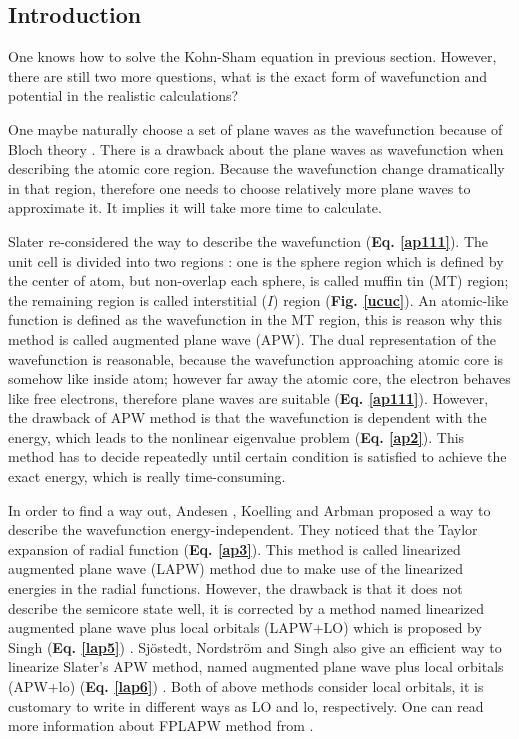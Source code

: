 \documentclass[a4paper, 12pt, titlepage,oneside,drop]{kthesis}
\begin{document}
\subsection{Introduction}

One knows how to solve the Kohn-Sham equation in previous section. However, there are still two more questions, what is the exact form of 
wavefunction and potential in the realistic calculations?  

One maybe naturally choose a set of plane waves as the wavefunction because of Bloch theory \cite{kittel1976introduction}. There is a drawback about the plane waves as wavefunction
when describing the atomic core region. Because the wavefunction change dramatically in that region, therefore one needs to choose relatively more plane
waves to approximate it. It implies it will take more time to calculate.

Slater re-considered the way to describe the wavefunction (\textbf{Eq. \ref{ap111}}). The unit cell is divided into two regions \cite{slater1937wave,loucks1967augmented}: one is the sphere region which is
defined by the center of atom, but non-overlap each sphere, is called muffin tin (MT) region; the remaining region is called interstitial ($I$)
region (\textbf{Fig. \ref{ucuc}}). An atomic-like function is defined as the wavefunction in the MT region, this is reason why this method is called augmented plane wave (APW).
The dual representation of the wavefunction is reasonable, because the wavefunction approaching atomic core is somehow like inside atom; however far away the atomic core, the electron behaves like free electrons,
therefore plane waves are suitable (\textbf{Eq. \ref{ap111}}). However, the drawback of APW method is that the wavefunction is dependent with the energy, which leads to the 
nonlinear eigenvalue problem (\textbf{Eq. \ref{ap2}}). This method has to decide repeatedly until certain condition is satisfied to achieve the exact energy, which is really time-consuming.

In order to find a way out, Andesen \cite{andersen1975linear}, Koelling and Arbman \cite{koelling1975use} proposed a way to describe the wavefunction energy-independent.
They noticed that the Taylor expansion of radial function (\textbf{Eq. \ref{ap3}}). This method is called linearized augmented plane wave (LAPW) method due to make use of the linearized energies in the radial functions. 
However, the drawback is that it does not describe the semicore state well, it is corrected by a method named linearized augmented plane wave plus local orbitals (LAPW+LO) which is proposed by Singh (\textbf{Eq. \ref{lap5}}) \cite{singh1991ground}.
Sjöstedt, Nordström and Singh also give an efficient way to linearize Slater's APW method, named augmented plane wave plus local orbitals (APW+lo) (\textbf{Eq. \ref{lap6}}) \cite{sjostedt2000alternative}. Both of above methods consider local orbitals, 
it is customary to write in different ways as LO and lo, respectively. One can read more information about FPLAPW method from \cite{nordstrom2006planewaves, excitingcode}.
\end{document}
